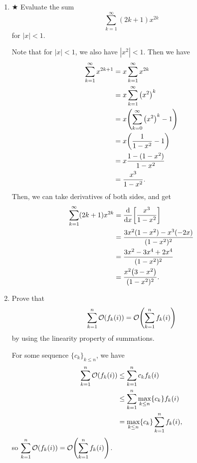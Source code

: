 \documentclass[AppendixA]{subfiles}
\begin{document}
\begin{enumerate}
		\item $\bigstar$ Evaluate the sum
		\[
			\sum_{k = 1}^\infty (2k + 1)x^{2k}
		\]
		for $|x| < 1$.
		\begin{answer}
			Note that for $|x| < 1$, we also have $|x^2| < 1$. Then we have
			\begin{align*}
				\sum_{k = 1}^\infty x^{2k+1} &= x\sum_{k = 1}^\infty x^{2k}\\
					&= x\sum_{k = 1}^\infty \qty(x^2)^k\\
					&= x\qty(\sum_{k = 0}^\infty \qty(x^2)^k - 1)\\
					&= x\qty(\frac{1}{1 - x^2} - 1)\\
					&= x\frac{1 - (1 - x^2)}{1 - x^2}\\
					&= \frac{x^3}{1 - x^2}.
			\end{align*}
			Then, we can take derivatives of both sides, and get
			\begin{align*}
				\sum_{k = 1}^\infty (2k+1)x^{2k} &= \dv{}{x} \qty[\frac{x^3}{1 - x^2}]\\
					&= \frac{3x^2(1 - x^2) - x^3(-2x)}{(1 - x^2)^2}\\
					&= \frac{3x^2 - 3x^4 + 2x^4}{(1 - x^2)^2}\\
					&= \frac{x^2\qty(3 - x^2)}{(1 - x^2)^2}.
			\end{align*}
		\end{answer}
		
		\item Prove that
		\[
			\sum_{k = 1}^n \mathcal{O}(f_k(i)) = \mathcal{O}\qty(\sum_{k = 1}^n f_k(i))
		\]
		by using the linearity property of summations.
		\begin{answer}
			For some sequence $\{c_k\}_{k \leq n}$, we have
			\begin{align*}
				\sum_{k = 1}^n \mathcal{O}(f_k(i)) &\leq \sum_{k = 1}^n c_kf_k(i)\\
					&\leq \sum_{k = 1}^n \max_{k \leq n}\{c_k\}f_k(i)\\
					&= \max_{k \leq n}\{c_k\} \sum_{k = 1}^n f_k(i),
			\end{align*}
			so $ \displaystyle \sum_{k = 1}^n \mathcal{O}(f_k(i)) = \mathcal{O}\qty(\sum_{k = 1}^n f_k(i))$.
		\end{answer}
		

\end{enumerate}
\end{document}
